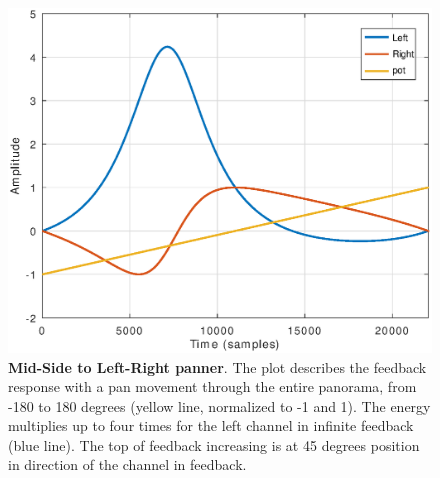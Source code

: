\begin{figure}[t]
\centering
\includegraphics[width=1\columnwidth]{CAPITOLI/1000/IMG/mspanlrfbpot}
\caption{\textbf{Mid-Side to Left-Right panner}. The plot describes the feedback response with a pan movement through the entire panorama, from -180 to 180 degrees (yellow line, normalized to -1 and 1). The energy multiplies up to four times for the left channel in infinite feedback (blue line). The top of feedback increasing is at 45 degrees position in direction of the channel in feedback.}
\label{fig:mspanlrfb}
\end{figure}

